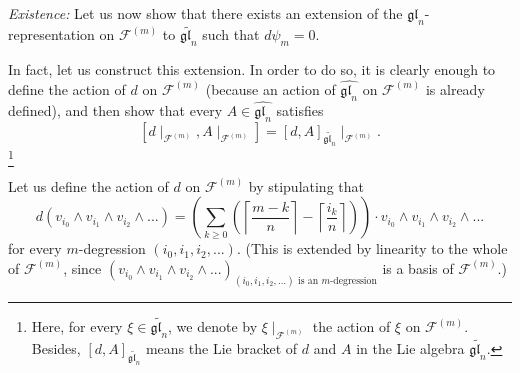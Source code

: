 \documentclass[etingof-lie.tex]{subfiles}
\begin{document}
\textit{Existence:} Let us now show that there exists an extension of the
$\widehat{\mathfrak{gl}_{n}}$-representation on $\mathcal{F}^{\left(
m\right)  }$ to $\widetilde{\mathfrak{gl}_{n}}$ such that $d\psi_{m}=0$.

In fact, let us construct this extension. In order to do so, it is clearly
enough to define the action of $d$ on $\mathcal{F}^{\left(  m\right)  }$
(because an action of $\widehat{\mathfrak{gl}_{n}}$ on $\mathcal{F}^{\left(
m\right)  }$ is already defined), and then show that every $A\in
\widehat{\mathfrak{gl}_{n}}$ satisfies%
\begin{equation}
\left[  d\mid_{\mathcal{F}^{\left(  m\right)  }},A\mid_{\mathcal{F}^{\left(
m\right)  }}\right]  =\left[  d,A\right]  _{\widetilde{\mathfrak{gl}_{n}}}%
\mid_{\mathcal{F}^{\left(  m\right)  }}. \label{pf.glwave.F.1}%
\end{equation}
\footnote{Here, for every $\xi\in\widetilde{\mathfrak{gl}_{n}}$, we denote by
$\xi\mid_{\mathcal{F}^{\left(  m\right)  }}$ the action of $\xi$ on
$\mathcal{F}^{\left(  m\right)  }$. Besides, $\left[  d,A\right]
_{\widetilde{\mathfrak{gl}_{n}}}$ means the Lie bracket of $d$ and $A$ in the
Lie algebra $\widetilde{\mathfrak{gl}_{n}}$.}

Let us define the action of $d$ on $\mathcal{F}^{\left(  m\right)  }$ by
stipulating that
\begin{equation}
d\left(  v_{i_{0}}\wedge v_{i_{1}}\wedge v_{i_{2}}\wedge...\right)  =\left(
\sum\limits_{k\geq0}\left(  \left\lceil \dfrac{m-k}{n}\right\rceil
-\left\lceil \dfrac{i_{k}}{n}\right\rceil \right)  \right)  \cdot v_{i_{0}%
}\wedge v_{i_{1}}\wedge v_{i_{2}}\wedge... \label{pf.glwave.F.2}%
\end{equation}
for every $m$-degression $\left(  i_{0},i_{1},i_{2},...\right)  $. (This is
extended by linearity to the whole of $\mathcal{F}^{\left(  m\right)  }$,
since $\left(  v_{i_{0}}\wedge v_{i_{1}}\wedge v_{i_{2}}\wedge...\right)
_{\left(  i_{0},i_{1},i_{2},...\right)  \text{ is an }m\text{-degression}}$ is
a basis of $\mathcal{F}^{\left(  m\right)  }$.)
\end{document}
